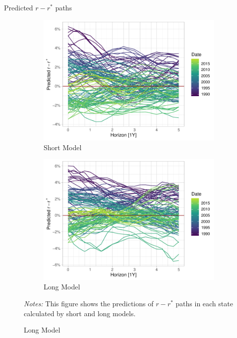 \documentclass[10pt,aspectratio=169]{beamer}
\begin{document}
\begin{frame}{Predicted $r-r^*$ paths}
    \begin{figure}[!htbp]\centering
        \begin{minipage}{\textwidth}
            \caption{}
            \begin{subfigure}[b]{0.49\textwidth}\centering
                \caption{Short Model}
                \includegraphics[width=\linewidth]{predicted_paths_short.pdf}
            \end{subfigure}%
            \begin{subfigure}[b]{0.49\textwidth}
                \caption{Long Model}
          \includegraphics[width=\linewidth]{predicted_paths_long.pdf}
        \end{subfigure}
          {\begin{flushleft}\tiny \textit{Notes:} This figure shows the predictions of $r-r^*$ paths in each state calculated by short and long models.\end{flushleft}} 
          \end{minipage}
      \end{figure}
\end{frame}
\end{document}

